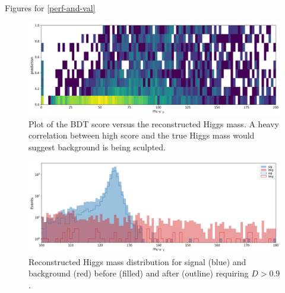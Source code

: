 \begin{section}{Figures for \ref{perf-and-val}}

\begin{figure}[htb]
\begin{center}
\includegraphics[width=.85\linewidth]{Dissertation/fig/bdt-bkgsculpt1.png}
\end{center}
\caption{Plot of the BDT score versus the reconstructed Higgs mass. A heavy correlation between high score and the true Higgs mass would suggest background is being sculpted.}
\label{fig:bdt-bkgsculpt1}
\end{figure}

\begin{figure}[htb]
\begin{center}
\includegraphics[width=.85\linewidth]{Dissertation/fig/bdt-bkgsculpt2.png}
\end{center}
\caption{Reconstructed Higgs mass distribution for signal (blue) and background (red) before (filled) and after (outline) requiring $D > 0.9$.}
\label{fig:bdt-bkgsculpt2}
\end{figure}

\end{section}

